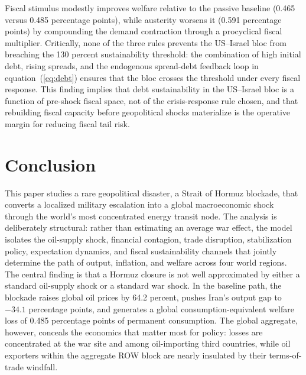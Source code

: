 \documentclass[12pt]{article}
\begin{document}
Fiscal stimulus modestly improves welfare relative to the passive baseline (0.465 versus 0.485 percentage points), while austerity worsens it (0.591 percentage points) by compounding the demand contraction through a procyclical fiscal multiplier. Critically, none of the three rules prevents the US--Israel bloc from breaching the 130 percent sustainability threshold: the combination of high initial debt, rising spreads, and the endogenous spread-debt feedback loop in equation~(\ref{eq:debt}) ensures that the bloc crosses the threshold under every fiscal response. This finding implies that debt sustainability in the US--Israel bloc is a function of pre-shock fiscal space, not of the crisis-response rule chosen, and that rebuilding fiscal capacity before geopolitical shocks materialize is the operative margin for reducing fiscal tail risk.

\FloatBarrier


\section{Conclusion}
\label{sec:conclusion}

This paper studies a rare geopolitical disaster, a Strait of Hormuz blockade, that converts a localized military escalation into a global macroeconomic shock through the world's most concentrated energy transit node. The analysis is deliberately structural: rather than estimating an average war effect, the model isolates the oil-supply shock, financial contagion, trade disruption, stabilization policy, expectation dynamics, and fiscal sustainability channels that jointly determine the path of output, inflation, and welfare across four world regions. The central finding is that a Hormuz closure is not well approximated by either a standard oil-supply shock or a standard war shock. In the baseline path, the blockade raises global oil prices by 64.2 percent, pushes Iran's output gap to $-34.1$ percentage points, and generates a global consumption-equivalent welfare loss of 0.485 percentage points of permanent consumption. The global aggregate, however, conceals the economics that matter most for policy: losses are concentrated at the war site and among oil-importing third countries, while oil exporters within the aggregate ROW block are nearly insulated by their terms-of-trade windfall.
\end{document}
